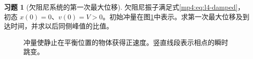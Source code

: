 \documentclass[11pt,openany,fontset=fandol]{ctexbook}
\theoremstyle{definition}\newtheorem{example}{例}[chapter]\newtheorem{exercise}{习题}[chapter]
\begin{document}
\par\medskip\noindent\begin{minipage}{\textwidth}
\begin{exercise}[欠阻尼系统的第一次最大位移]\label{mp4:exercise:l4-h9}
欠阻尼振子满足式\eqref{mp4:eq:l4-damped}，初态 $x(0)=0$、$v(0)=V>0$。初始冲量在图\ref{mp4:fig:l4-h9-q}中表示。求第一次最大位移及到达时间，并求以后同侧峰值的比值。
\end{exercise}

\begin{figure}[H]\centering
{}
\caption{冲量使静止在平衡位置的物体获得正速度。竖直线段表示相点的瞬时跳变。}\label{mp4:fig:l4-h9-q}
\end{figure}
\end{minipage}\par\medskip
\end{document}
